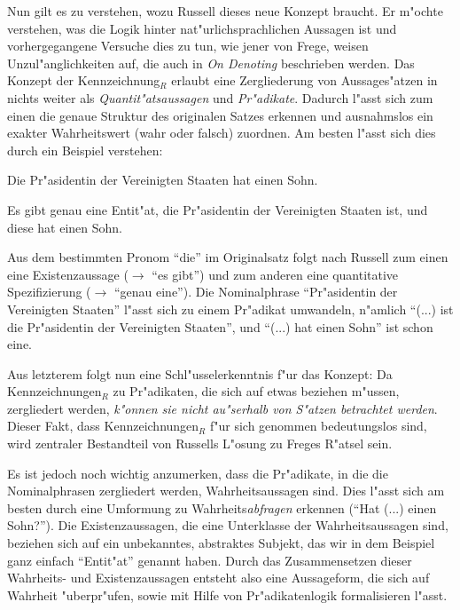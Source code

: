 \documentclass[a4paper, emulatestandardclasses, 12pt]{scrartcl}
\begin{document}
\begin{onehalfspace}

Nun gilt es zu verstehen, wozu Russell dieses neue Konzept braucht. Er m"ochte verstehen, was die Logik hinter nat"urlichsprachlichen Aussagen ist und vorhergegangene Versuche dies zu tun, wie jener von Frege, weisen Unzul"anglichkeiten auf, die auch in \emph{On Denoting} beschrieben werden. Das Konzept der Kennzeichnung$_{R}$ erlaubt eine Zergliederung von Aussages"atzen in nichts weiter als \emph{Quantit"atsaussagen} und \emph{Pr"adikate}. Dadurch l"asst sich zum einen die genaue Struktur des originalen Satzes erkennen und ausnahmslos ein exakter Wahrheitswert (wahr oder falsch) zuordnen. Am besten l"asst sich dies durch ein Beispiel verstehen:

\begin{description}[leftmargin=!,labelwidth=\widthof{\bfseries Zergliederung}]
    \item[Originalsatz] Die Pr"asidentin der Vereinigten Staaten hat einen Sohn.
    \item[Zergliederung] Es gibt genau eine Entit"at, die Pr"asidentin der Vereinigten Staaten ist, und diese hat einen Sohn. 
\end{description}

Aus dem bestimmten Pronom "`die"' im Originalsatz folgt nach Russell zum einen eine Existenzaussage ($\rightarrow$ "`es gibt"') und zum anderen eine quantitative Spezifizierung ($\rightarrow$ "`genau eine"'). Die Nominalphrase "`Pr"asidentin der Vereinigten Staaten"' l"asst sich zu einem Pr"adikat umwandeln, n"amlich "`(...) ist die Pr"asidentin der Vereinigten Staaten"', und "`(...) hat einen Sohn"' ist schon eine.

Aus letzterem folgt nun eine Schl"usselerkenntnis f"ur das Konzept: Da Kennzeichnungen$_{R}$  zu Pr"adikaten, die sich auf etwas beziehen m"ussen, zergliedert werden, \emph{k"onnen sie nicht au"serhalb von S"atzen betrachtet werden}. Dieser Fakt, dass Kennzeichnungen$_{R}$ f"ur sich genommen bedeutungslos sind, wird zentraler Bestandteil von Russells L"osung zu Freges R"atsel sein. 

Es ist jedoch noch wichtig anzumerken, dass die Pr"adikate, in die die Nominalphrasen zergliedert werden, Wahrheitsaussagen sind. Dies l"asst sich am besten durch eine Umformung zu Wahrheits\emph{abfragen} erkennen ("`Hat (...) einen Sohn?"'). Die Existenzaussagen, die eine Unterklasse der Wahrheitsaussagen sind, beziehen sich auf ein unbekanntes, abstraktes Subjekt, das wir in dem Beispiel ganz einfach "`Entit"at"' genannt haben. Durch das Zusammensetzen dieser Wahrheits- und Existenzaussagen entsteht also eine Aussageform, die sich auf Wahrheit "uberpr"ufen, sowie mit Hilfe von Pr"adikatenlogik formalisieren l"asst.


\end{onehalfspace}
\end{document}
